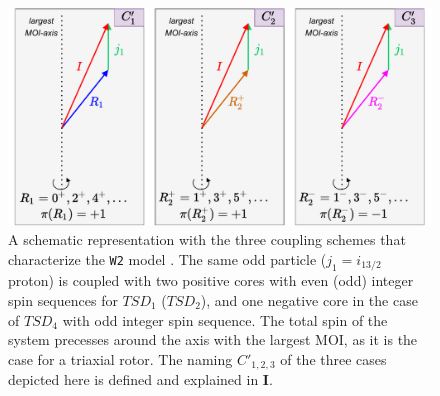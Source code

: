 \documentclass[myclassdoc,debug]{rjparticle}
\begin{document}
\begin{figure}[ht]
    \centering
    \includegraphics[scale=0.65]{figs/coupling_schemes_C1C2C3.pdf}
    \caption{A schematic representation with the three coupling schemes that characterize the \texttt{W2} model \cite{poenaru2021parity}. The same odd particle ($j_1=i_{13/2}$ proton) is coupled with two positive cores with even (odd) integer spin sequences for $TSD_1$ ($TSD_2$), and one negative core in the case of $TSD_4$ with odd integer spin sequence. The total spin of the system precesses around the axis with the largest MOI, as it is the case for a triaxial rotor. The naming $C'_{1,2,3}$ of the three cases depicted here is defined and explained in \textbf{I}.}
    \label{three-couplings}
\end{figure}
\end{document}
